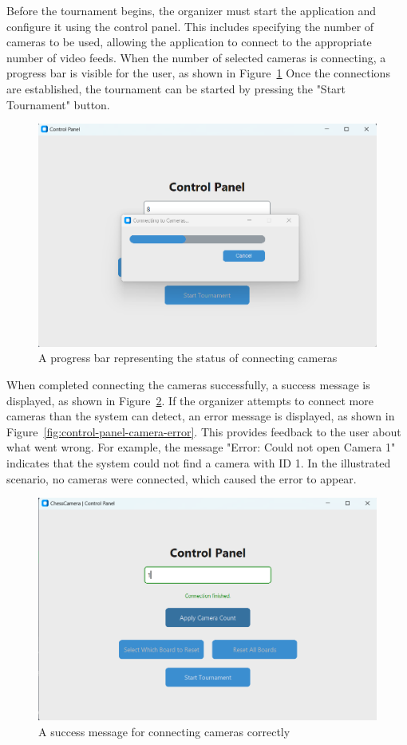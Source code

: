 Before the tournament begins, the organizer must start the application and configure it using the control panel. This includes specifying the number of cameras to be used, allowing the application to connect to the appropriate number of video feeds. When the number of selected cameras is connecting, a progress bar is visible for the user, as shown in Figure~\ref{fig:control-panel-camera} Once the connections are established, the tournament can be started by pressing the "Start Tournament" button. \\
 
\begin{figure}[h!] \centering \includegraphics[width=0.75\linewidth]{figures/results/frontend/control-panel/camera-progress.png} \caption[Progress bar for camera connections]{A progress bar representing the status of connecting cameras}\label{fig:control-panel-camera} \end{figure}

When completed connecting the cameras successfully, a success message is displayed, as shown in Figure~\ref{fig:control-panel-camera-success}. If the organizer attempts to connect more cameras than the system can detect, an error message is displayed, as shown in Figure~\ref{fig:control-panel-camera-error}. This provides feedback to the user about what went wrong. For example, the message "Error: Could not open Camera 1" indicates that the system could not find a camera with ID 1. In the illustrated scenario, no cameras were connected, which caused the error to appear. \\

\begin{figure}[h!] \centering \includegraphics[width=0.75\linewidth]{figures/results/frontend/control-panel/camera-success.png} \caption[Success message for camera connections]{A success message for  connecting cameras correctly}\label{fig:control-panel-camera-success} \end{figure}

